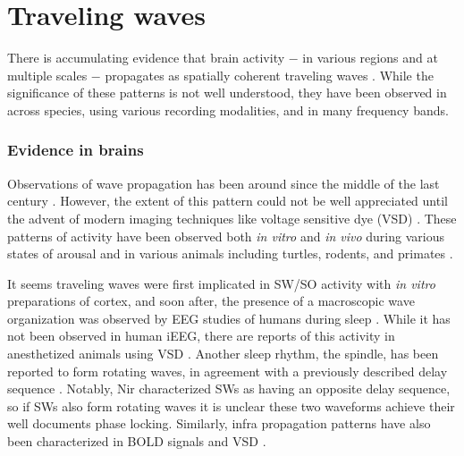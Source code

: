 \section*{Traveling waves}
There is accumulating evidence that brain activity $-$ in various regions and at multiple scales $-$ propagates as spatially coherent traveling waves \citep{Wu2008,Muller2018}. While the significance of these patterns is not well understood, they have been observed in across species, using various recording modalities, and in many frequency bands. 

\subsubsection*{Evidence in brains}
Observations of wave propagation has been around since the middle of the last century \citep{Leo1944, Burns1951}. However, the extent of this pattern could not be well appreciated until the advent of modern imaging techniques like voltage sensitive dye (VSD) \citep{Grinvald1994, Prechtl1997, Muller2018}. These patterns of activity have been observed both \textit{in vitro} and \textit{in vivo} during various states of arousal and in various animals including turtles, rodents, and primates \cite{Grinvald1994, Prechtl1997, Takahashi2011, Muller2014}. 

It seems traveling waves were first implicated in SW/SO activity with \textit{in vitro} preparations of cortex, and soon after, the presence of a macroscopic wave organization was observed by EEG studies of humans during sleep \citep{Sanchez-Vives2000,Massimini2004}. While it has not been observed in human iEEG, there are reports of this activity in anesthetized animals using VSD \citep{Luczak2007,Mohajerani2010}. Another sleep rhythm, the spindle, has been reported to form rotating waves, in agreement with a previously described delay sequence \citep{Nir2011, Muller2016}. Notably, Nir characterized SWs as having an opposite delay sequence, so if SWs also form rotating waves it is unclear these two waveforms achieve their well documents phase locking. Similarly, infra propagation patterns have also been characterized in BOLD signals and VSD \citep{Kiviniemi2015c,Mitra2015,Mitra2018a}.

